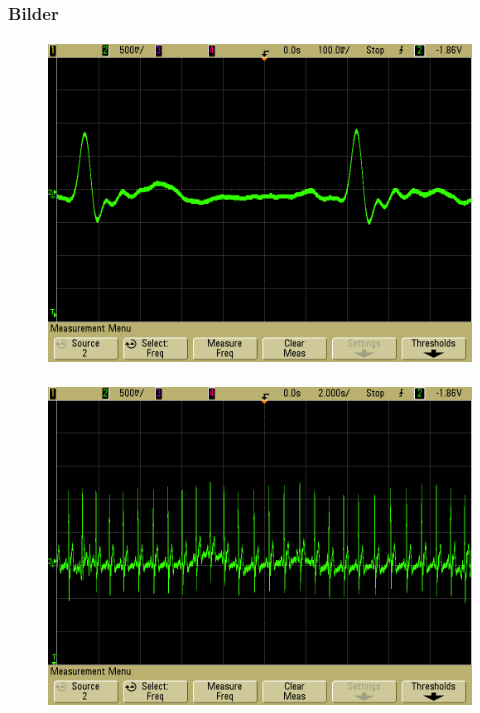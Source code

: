 \begin{frame}
\frametitle{Bilder}
\framesubtitle{}
    \begin{figure}[H]
    \begin{center}
            \includegraphics[scale=0.3]{./img/oszi/scope_13.png}
    \end{center}
    \end{figure}
    
\end{frame}
\begin{frame}
\framesubtitle{}
    \begin{figure}[H]
    \begin{center}
            \includegraphics[scale=0.3]{./img/oszi/scope_14.png}
    \end{center}
    \end{figure}
    
\end{frame}

